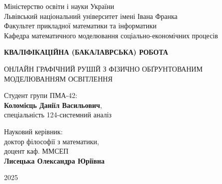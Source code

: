 \thispagestyle{empty}
\renewcommand{\baselinestretch}{1}

\Large
\begin{center}
Міністерство освіти і науки України \\
Львівський національний університет імені Івана Франка \\
Факультет прикладної математики та інформатики \\
Кафедра математичного моделювання соціально-економічних процесів
\end{center}

\vspace*{2cm}
\begin{center}
 \textbf{КВАЛІФІКАЦІЙНА (БАКАЛАВРСЬКА) РОБОТА}
\end{center}

\vspace*{1cm}

\begin{center}
ОНЛАЙН ГРАФІЧНИЙ РУШІЙ З ФІЗИЧНО ОБҐРУНТОВАНИМ МОДЕЛЮВАННЯМ ОСВІТЛЕННЯ\\
\end{center}
\vspace*{1cm}
\normalsize

\vspace*{1.cm}
\noindent
\hspace*{8.6cm}Студент групи ПМА-42: \\
\hspace*{8.6cm}\textbf{Коломієць Даніїл Васильович}, \\
\hspace*{8.6cm}спеціальність 124-системний аналіз

\vspace*{0.5cm}
\noindent
\hspace*{8.6cm}Науковий керівник: \\
\hspace*{8.6cm}доктор філософії з математики, \\
\hspace*{8.6cm}доцент каф. ММСЕП \\
\hspace*{8.6cm}\textbf{Лисецька Олександра Юріївна}

\vspace*{0.0cm}
\noindent

\vspace*{1.cm}
\large
\begin{center}
2025
\end{center}
\normalsize
\renewcommand{\baselinestretch}{1.3}
\tableofcontents
\maketitle